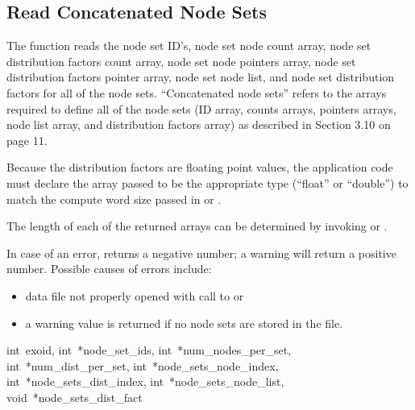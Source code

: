 \subsection{Read Concatenated Node Sets}

The function  reads the node set
ID's, node set node count array, node set distribution factors count
array, node set node pointers array, node set distribution factors
pointer array, node set node list, and node set distribution factors
for all of the node sets. ``Concatenated node sets'' refers to the
arrays required to define all of the node sets (ID array, counts
arrays, pointers arrays, node list array, and distribution factors
array) as described in Section 3.10 on page 11.

Because the distribution factors are floating point values, the
application code must declare the array passed to be the appropriate
type (``float'' or ``double'') to match the compute word size passed
in  or .

The length of each of the returned arrays can be determined by
invoking  or .

In case of an error,  returns a
negative number; a warning will return a positive number. Possible
causes of errors include:
\begin{itemize}

 \item data file not properly opened with call to 
 or 

 \item a warning value is returned if no node sets are stored in the
 file.
\end{itemize}

{int~exoid, 
int~*node_set_ids,
int~*num_nodes_per_set, 
int~*num_dist_per_set, 
int~*node_sets_node_index,
int~*node_sets_dist_index, 
int~*node_sets_node_list,
void~*node_sets_dist_fact}

